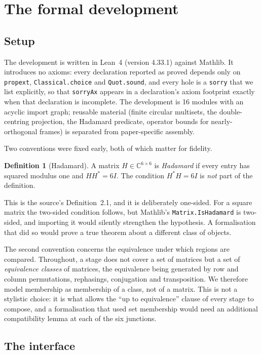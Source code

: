 \documentclass[11pt]{article}
\theoremstyle{definition}
\newtheorem{definition}[theorem]{Definition}
\newcommand{\C}{\mathbb{C}}
\begin{document}
\section{The formal development}

\subsection{Setup}

The development is written in Lean~4 (version 4.33.1) against Mathlib. It introduces no axioms: every
declaration reported as proved depends only on \texttt{propext}, \texttt{Classical.choice} and
\texttt{Quot.sound}, and every hole is a \texttt{sorry} that we list explicitly, so that
\texttt{sorryAx} appears in a declaration's axiom footprint exactly when that declaration is
incomplete. The development is 16 modules with an acyclic import graph; reusable material (finite
circular multisets, the double-centring projection, the Hadamard predicate, operator bounds for
nearly-orthogonal frames) is separated from paper-specific assembly.

Two conventions were fixed early, both of which matter for fidelity.

\begin{definition}[Hadamard]
A matrix $H\in \C^{6\times 6}$ is \emph{Hadamard} if every entry has squared modulus one and
$HH^*=6I$. The condition $H^*H=6I$ is \emph{not} part of the definition.
\end{definition}

This is the source's Definition~2.1, and it is deliberately one-sided. For a square matrix the
two-sided condition follows, but Mathlib's \texttt{Matrix.IsHadamard} is two-sided, and importing it
would silently strengthen the hypothesis. A formalisation that did so would prove a true theorem
about a different class of objects.

The second convention concerns the equivalence under which regions are compared. Throughout, a
stage does not cover a set of matrices but a set of \emph{equivalence classes} of matrices, the
equivalence being generated by row and column permutations, rephasings, conjugation and
transposition. We therefore model membership as membership of a class, not of a matrix. This is not
a stylistic choice: it is what allows the ``up to equivalence'' clause of every stage to compose,
and a formalisation that used set membership would need an additional compatibility lemma at each
of the six junctions.

\subsection{The interface}
\label{sec:assembly}
\end{document}
